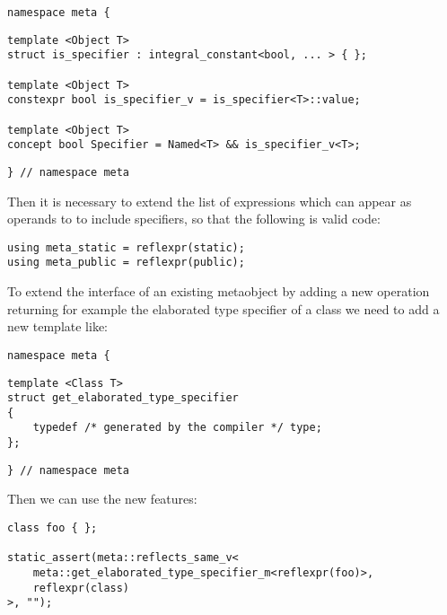 \begin{verbatim}
namespace meta {
\end{verbatim}
\begin{verbatim}
template <Object T>
struct is_specifier : integral_constant<bool, ... > { };

template <Object T>
constexpr bool is_specifier_v = is_specifier<T>::value;

template <Object T>
concept bool Specifier = Named<T> && is_specifier_v<T>;

\end{verbatim}
\begin{verbatim}
} // namespace meta
\end{verbatim}

Then it is necessary to extend the list of expressions which can appear
as operands to \verb@reflexpr@ to include specifiers, so that the following
is valid code:

\begin{verbatim}
using meta_static = reflexpr(static);
using meta_public = reflexpr(public);
\end{verbatim}

To extend the interface of an existing metaobject by adding a new operation
returning for example the elaborated type specifier of a class we need to
add a new template like:

\begin{verbatim}
namespace meta {
\end{verbatim}
\begin{verbatim}
template <Class T>
struct get_elaborated_type_specifier
{
	typedef /* generated by the compiler */ type;
};
\end{verbatim}
\begin{verbatim}
} // namespace meta
\end{verbatim}

Then we can use the new features:

\begin{verbatim}
class foo { };

static_assert(meta::reflects_same_v<
	meta::get_elaborated_type_specifier_m<reflexpr(foo)>,
	reflexpr(class)
>, "");
\end{verbatim}

